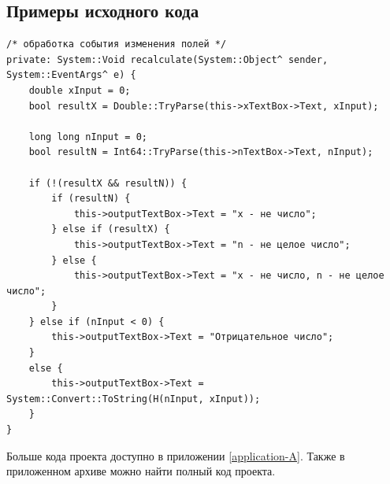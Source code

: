 \subsection{Примеры исходного кода}
\begin{verbatim}
/* обработка события изменения полей */
private: System::Void recalculate(System::Object^ sender, System::EventArgs^ e) {
	double xInput = 0;
	bool resultX = Double::TryParse(this->xTextBox->Text, xInput);

	long long nInput = 0;
	bool resultN = Int64::TryParse(this->nTextBox->Text, nInput);

	if (!(resultX && resultN)) {
		if (resultN) {
			this->outputTextBox->Text = "x - не число";
		} else if (resultX) {
			this->outputTextBox->Text = "n - не целое число";
		} else {
			this->outputTextBox->Text = "x - не число, n - не целое число";
		}
	} else if (nInput < 0) {
		this->outputTextBox->Text = "Отрицательное число";
	}
	else {
		this->outputTextBox->Text = System::Convert::ToString(H(nInput, xInput));
	}
}
\end{verbatim}

Больше кода проекта доступно в приложении \ref{application-A}. Также в приложенном архиве можно найти полный код проекта.